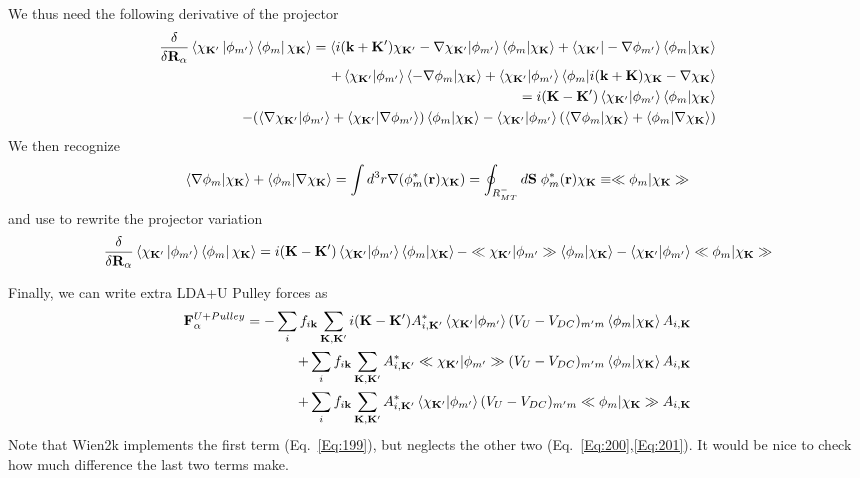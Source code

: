 \documentclass[aps,prb,floatfix,epsfig,singlecolumn,showpacs,preprintnumbers]{revtex4}
\newcommand{\vR}{{\mathbf{R}}}
\newcommand{\vF}{{\mathbf{F}}}
\renewcommand{\vr}{{\mathbf{r}}}
\newcommand{\vk}{{\mathbf{k}}}
\newcommand{\vK}{{\mathbf{K}}}
\newcommand{\vS}{{\mathbf{S}}}
\begin{document}
We thus need the following derivative of the projector
\begin{eqnarray}
\frac{\delta}{\delta\vR_\alpha} \braket{\chi_{\vK'} \ket{\phi_{m'}}\bra{\phi_{m}}\chi_{\vK}}=
\braket{i(\vk+\vK')\chi_{\vK'}-\nabla\chi_{\vK'}|\phi_{m'}}\braket{\phi_m|\chi_{\vK}}+
\braket{\chi_{\vK'}|-\nabla\phi_{m'}}\braket{\phi_m|\chi_{\vK}}\\
+\braket{\chi_{\vK'}|\phi_{m'}}\braket{-\nabla\phi_m|\chi_{\vK}}+
\braket{\chi_{\vK'}|\phi_{m'}}\braket{\phi_m|i(\vk+\vK)\chi_{\vK}-\nabla\chi_{\vK}}\\
=
i(\vK-\vK')\braket{\chi_{\vK'}|\phi_{m'}}\braket{\phi_m|\chi_{\vK}}\\
-(\braket{\nabla\chi_{\vK'}|\phi_{m'}}+\braket{\chi_{\vK'}|\nabla\phi_{m'}})\braket{\phi_m|\chi_{\vK}}
-\braket{\chi_{\vK'}|\phi_{m'}}(\braket{\nabla\phi_m|\chi_{\vK}}+\braket{\phi_m|\nabla\chi_{\vK}})
\end{eqnarray}
We then recognize
\begin{eqnarray}
\braket{\nabla\phi_m|\chi_{\vK}}+\braket{\phi_m|\nabla\chi_{\vK}}=
\int d^3r \nabla(\phi^*_m(\vr) \chi_{\vK}) = \oint_{R_{MT}^-} d\vS\; \phi^*_m(\vr) \chi_{\vK}
\equiv \ll \phi_m|\chi_\vK \gg
\label{Eq:197}
\end{eqnarray}
and use to rewrite the projector variation
\begin{eqnarray}
\frac{\delta}{\delta\vR_\alpha} \braket{\chi_{\vK'} \ket{\phi_{m'}}\bra{\phi_{m}}\chi_{\vK}}=
i(\vK-\vK')\braket{\chi_{\vK'}|\phi_{m'}}\braket{\phi_m|\chi_{\vK}}
-\ll \chi_{\vK'}|\phi_{m'} \gg \braket{\phi_m|\chi_{\vK}}
-\braket{\chi_{\vK'}|\phi_{m'}}\ll \phi_m|\chi_{\vK} \gg 
\end{eqnarray}

Finally, we can write extra LDA+U Pulley forces as
\begin{eqnarray}
\vF^{U+Pulley}_\alpha = 
-\sum_{i} f_{i\vk} \sum_{\vK,\vK'}i(\vK-\vK')
A_{i,\vK'}^* 
\braket{\chi_{\vK'}|\phi_{m'}}
(V_U-V_{DC})_{m'm}
\braket{\phi_m|\chi_{\vK}}
A_{i,\vK}
\label{Eq:199}\\
+\sum_{i} f_{i\vk} \sum_{\vK,\vK'}
A_{i,\vK'}^* 
\ll \chi_{\vK'}|\phi_{m'} \gg (V_U-V_{DC})_{m'm}  \braket{\phi_m|\chi_{\vK}}A_{i,\vK}
\label{Eq:200}\\
+\sum_{i} f_{i\vk} \sum_{\vK,\vK'}
A_{i,\vK'}^* 
\braket{\chi_{\vK'}|\phi_{m'}}(V_U-V_{DC})_{m'm}\ll \phi_m|\chi_{\vK} \gg
A_{i,\vK}
\label{Eq:201}
\end{eqnarray}
Note that Wien2k implements the first term (Eq.~\ref{Eq:199}), but
neglects the other two (Eq.~\ref{Eq:200},\ref{Eq:201}). It would be
nice to check how much difference the last two terms make.
\end{document}
